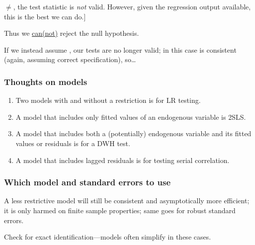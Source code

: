 \documentclass[8pt,letterpaper, landscape]{extarticle} %
\begin{document}
\begin{multicols}{3}
\begin{description}
[Note that the validity of this distance function requires the restricted and unrestricted models to use the same weighting matrix; since \makebox[0.5in]{\hrulefill}$ \neq $\makebox[0.5in]{\hrulefill}, the test statistic is \textit{not} valid. However, given the regression output available, this is the best we can do.]

Thus we \underline{can(not)} reject the null hypothesis.

If we instead assume \makebox[0.5in]{\hrulefill}, our tests are no longer valid; in this case \makebox[0.5in]{\hrulefill} is consistent (again, assuming correct specification), so\ldots

\subsubsection*{Thoughts on models}
\begin{enumerate}
\item Two models with and without a restriction is for LR testing.
\item A model that includes only fitted values of an endogenous variable is 2SLS.
\item A model that includes both a (potentially) endogenous variable and its fitted values or residuals is for a DWH test.
\item A model that includes lagged residuals is for testing serial correlation.
\end{enumerate}

\subsubsection*{Which model and standard errors to use}
A less restrictive model will still be consistent and asymptotically more efficient; it is only harmed on finite sample properties; same goes for robust standard errors.

Check for exact identification---models often simplify in these cases.


\end{description}
\end{multicols}
\end{document}
